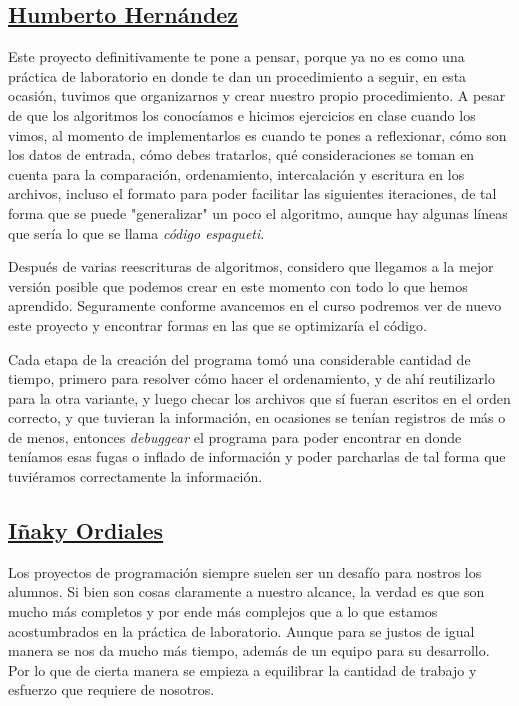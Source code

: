 \documentclass[letter]{report}
\begin{document}
\subsection*{\underline{Humberto Hernández}}
Este proyecto definitivamente te pone a pensar, porque ya no es como una práctica de laboratorio en donde te dan un procedimiento a seguir, en esta ocasión, tuvimos que organizarnos y crear nuestro propio procedimiento. A pesar de que los algoritmos los conocíamos e hicimos ejercicios en clase cuando los vimos, al momento de implementarlos es cuando te pones a reflexionar, cómo son los datos de entrada, cómo debes tratarlos, qué consideraciones se toman en cuenta para la comparación, ordenamiento, intercalación y escritura en los archivos, incluso el formato para poder facilitar las siguientes iteraciones, de tal forma que se puede "generalizar" un poco el algoritmo, aunque hay algunas líneas que sería lo que se llama \textit{código espagueti}.\medskip

Después de varias reescrituras de algoritmos, considero que llegamos a la mejor versión posible que podemos crear en este momento con todo lo que hemos aprendido. Seguramente conforme avancemos en el curso podremos ver de nuevo este proyecto y encontrar formas en las que se optimizaría el código.\medskip

Cada etapa de la creación del programa tomó una considerable cantidad de tiempo, primero para resolver cómo hacer el ordenamiento, y de ahí reutilizarlo para la otra variante, y luego checar los archivos que sí fueran escritos en el orden correcto, y que tuvieran la información, en ocasiones se tenían registros de más o de menos, entonces \textit{debuggear} el programa para poder encontrar en donde teníamos esas fugas o inflado de información y poder parcharlas de tal forma que tuviéramos correctamente la información.\medskip

\subsection*{\underline{Iñaky Ordiales}}
\noindent Los proyectos de programación siempre suelen ser un desafío para nostros los alumnos. Si bien son cosas claramente a nuestro alcance, la verdad es que son mucho más completos y por ende más complejos que a lo que estamos acostumbrados en la práctica de laboratorio. Aunque para se justos de igual manera se nos da mucho más tiempo, además de un equipo para su desarrollo. Por lo que de cierta manera se empieza a equilibrar la cantidad de trabajo y esfuerzo que requiere de nosotros.\medskip
\end{document}
